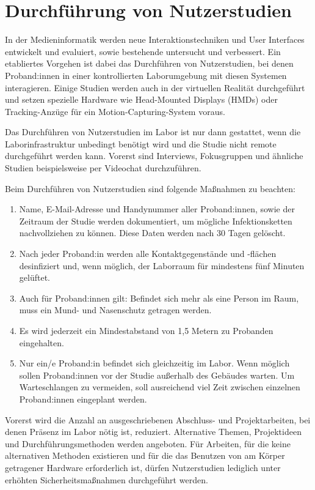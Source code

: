 \section{Durchführung von Nutzerstudien}\label{sec:nutzerstudien}

\noindent
In der Medieninformatik werden neue Interaktionstechniken und User Interfaces entwickelt und evaluiert, sowie bestehende untersucht und verbessert. Ein etabliertes Vorgehen ist dabei das Durchführen von Nutzerstudien, bei denen Proband:innen in einer kontrollierten Laborumgebung mit diesen Systemen interagieren. Einige Studien werden auch in der virtuellen Realität durchgeführt und setzen spezielle Hardware wie Head-Mounted Displays (HMDs) oder Tracking-Anzüge für ein Motion-Capturing-System voraus.

\medskip
\noindent
Das Durchführen von Nutzerstudien im Labor ist nur dann gestattet, wenn die Laborinfrastruktur unbedingt benötigt wird und die Studie nicht remote durchgeführt werden kann. Vorerst sind Interviews, Fokusgruppen und ähnliche Studien beispielsweise per Videochat durchzuführen.

\noindent
Beim Durchführen von Nutzerstudien sind folgende Maßnahmen zu beachten:

\begin{enumerate}
    \item Name, E-Mail-Adresse und Handynummer aller Proband:innen, sowie der Zeitraum der Studie werden dokumentiert, um mögliche Infektionsketten nachvollziehen zu können. Diese Daten werden nach 30 Tagen gelöscht.
    \item Nach jeder Proband:in werden alle Kontaktgegenstände und -flächen desinfiziert und, wenn möglich, der Laborraum für mindestens fünf Minuten gelüftet.
    \item Auch für Proband:innen gilt: Befindet sich mehr als eine Person im Raum, muss ein Mund- und Nasenschutz getragen werden.
    \item Es wird jederzeit ein Mindestabstand von 1,5 Metern zu Probanden eingehalten.
    \item Nur ein/e Proband:in befindet sich gleichzeitig im Labor. Wenn möglich sollen Proband:innen vor der Studie außerhalb des Gebäudes warten. Um Warteschlangen zu vermeiden, soll ausreichend viel Zeit zwischen einzelnen Proband:innen eingeplant werden.
\end{enumerate}

\noindent
Vorerst wird die Anzahl an ausgeschriebenen Abschluss- und Projektarbeiten, bei denen Präsenz im Labor nötig ist, reduziert. Alternative Themen, Projektideen und Durchführungsmethoden werden angeboten.
Für Arbeiten, für die keine alternativen Methoden existieren und für die das Benutzen von am Körper getragener Hardware erforderlich ist, dürfen Nutzerstudien lediglich unter erhöhten Sicherheitsmaßnahmen durchgeführt werden.

